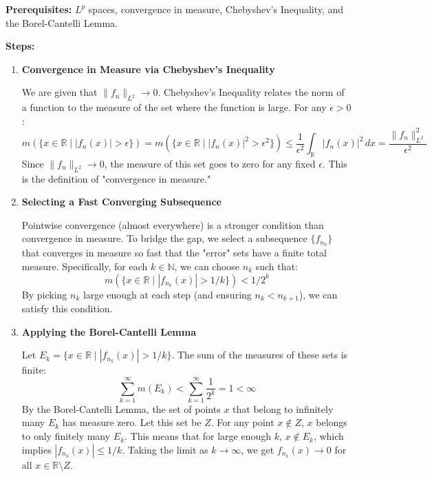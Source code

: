 \begin{solution}
\textbf{Prerequisites:} 
$L^p$ spaces, convergence in measure, Chebyshev's Inequality, and the Borel-Cantelli Lemma.

\par\vspace{\baselineskip}
\textbf{Steps:}

\begin{enumerate}
    \item \textbf{Convergence in Measure via Chebyshev's Inequality}

    We are given that $\|f_n\|_{L^2} \to 0$. Chebyshev's Inequality relates the norm of a function to the measure of the set where the function is large. For any $\epsilon > 0$:
    \[
    m(\{x \in \mathbb{R} \mid |f_n(x)| > \epsilon\}) = m(\{x \in \mathbb{R} \mid |f_n(x)|^2 > \epsilon^2\}) \leq \frac{1}{\epsilon^2} \int_{\mathbb{R}} |f_n(x)|^2 \, dx = \frac{\|f_n\|_{L^2}^2}{\epsilon^2}
    \]
    Since $\|f_n\|_{L^2} \to 0$, the measure of this set goes to zero for any fixed $\epsilon$. This is the definition of "convergence in measure."

    \item \textbf{Selecting a Fast Converging Subsequence}

    Pointwise convergence (almost everywhere) is a stronger condition than convergence in measure. To bridge the gap, we select a subsequence $\{f_{n_k}\}$ that converges in measure so fast that the "error" sets have a finite total measure.
    Specifically, for each $k \in \mathbb{N}$, we can choose $n_k$ such that:
    \[
    m(\{x \in \mathbb{R} \mid |f_{n_k}(x)| > 1/k\}) < 1/2^k
    \]
    By picking $n_k$ large enough at each step (and ensuring $n_k < n_{k+1}$), we can satisfy this condition.

    \item \textbf{Applying the Borel-Cantelli Lemma}

    Let $E_k = \{x \in \mathbb{R} \mid |f_{n_k}(x)| > 1/k\}$. The sum of the measures of these sets is finite:
    \[
    \sum_{k=1}^\infty m(E_k) < \sum_{k=1}^\infty \frac{1}{2^k} = 1 < \infty
    \]
    By the Borel-Cantelli Lemma, the set of points $x$ that belong to infinitely many $E_k$ has measure zero. Let this set be $Z$. For any point $x \notin Z$, $x$ belongs to only finitely many $E_k$.
    This means that for large enough $k$, $x \notin E_k$, which implies $|f_{n_k}(x)| \leq 1/k$.
    Taking the limit as $k \to \infty$, we get $f_{n_k}(x) \to 0$ for all $x \in \mathbb{R} \setminus Z$.


\end{enumerate}
\end{solution}
